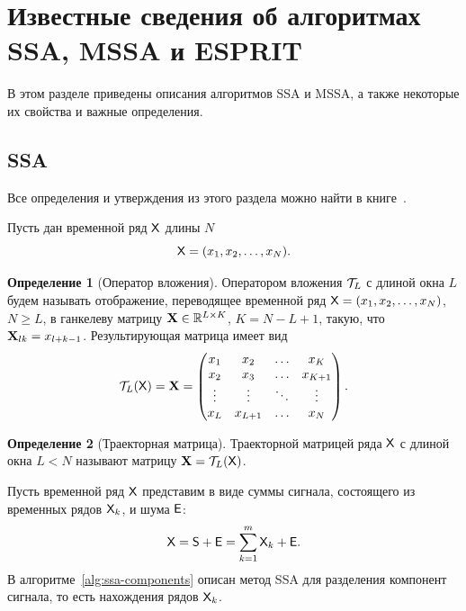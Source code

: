 \documentclass[specialist,
  substylefile = spbu.rtx,
subf,href,colorlinks=true, 12pt]{disser}
\theoremstyle{plain}
\theoremstyle{definition}
\newtheorem{definition}{Определение}[section]
\theoremstyle{remark}
\begin{document}
\newpage

\section{Известные сведения об алгоритмах SSA, MSSA и
ESPRIT}\label{sec:known-results-ssa}
В этом разделе приведены описания алгоритмов SSA и MSSA, а также
некоторые их свойства и важные определения.

\subsection{SSA}\label{subsec:ssa}
Все определения и утверждения из этого раздела можно найти в книге~\cite{ssa}.

Пусть дан временной ряд $\mathsf{X}$ длины $N$
\[
  \mathsf{X}=(x_1,x_2,\ldots,x_N).
\]

\begin{definition}[Оператор вложения]
  \label{def:injection-op}
  Оператором вложения $\mathcal{T}_L$ с длиной окна $L$ будем называть
  отображение, переводящее временной ряд
  $\mathsf{X}=(x_1, x_2,\ldots, x_N)$, $N \geqslant L$, в ганкелеву матрицу
  $\mathbf{X}\in \mathbb{R}^{L \times K}$, $K = N-L+1$,
  такую, что $\mathbf{X}_{lk}=x_{l+k-1}$.
  Результирующая матрица имеет вид
  \[
    \mathcal{T}_L(\mathsf{X}) = \mathbf{X} =
    \begin{pmatrix}
      x_1    & x_2     & \ldots & x_K     \\
      x_2    & x_3     & \ldots & x_{K+1} \\
      \vdots & \vdots  & \ddots & \vdots  \\
      x_L    & x_{L+1} & \ldots & x_N
    \end{pmatrix}.
  \]
\end{definition}

\begin{definition}[Траекторная матрица]
  Траекторной матрицей ряда $\mathsf{X}$ с длиной окна $L<N$ называют
  матрицу $\mathbf{X}=\mathcal{T}_L(\mathsf{X})$.
\end{definition}

Пусть временной ряд $\mathsf{X}$ представим в виде суммы сигнала, состоящего
из временных рядов $\mathsf{X}_k$, и шума $\mathsf{E}$:
\[
  \mathsf{X} = \mathsf{S} + \mathsf{E} =\sum_{k=1}^{m} \mathsf{X}_k + \mathsf{E}.
\]
В алгоритме~\ref{alg:ssa-components} описан метод SSA для разделения
компонент сигнала, то есть
нахождения рядов $\mathsf{X}_k$.
\end{document}
